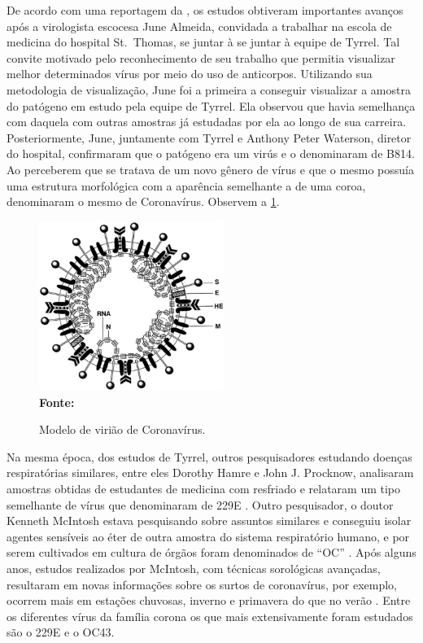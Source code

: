 \documentclass[
  fleqn,ebook]{ic}
\begin{document}
De acordo com uma reportagem da \cite{almeidaBBC}, os estudos obtiveram
importantes avanços após a virologista escocesa June Almeida, convidada
a trabalhar na escola de medicina do hospital St.~Thomas, se juntar à se juntar
à equipe de Tyrrel. Tal convite motivado pelo reconhecimento de seu trabalho que
permitia visualizar melhor determinados vírus por meio do uso de anticorpos.
Utilizando sua metodologia de visualização, June foi a primeira a conseguir
visualizar a amostra do patógeno em estudo pela equipe de Tyrrel. Ela observou
que havia semelhança com daquela com outras amostras já estudadas por ela ao
longo de sua carreira. Posteriormente, June, juntamente com Tyrrel e Anthony
Peter Waterson, diretor do hospital, confirmaram que o patógeno era um virús e
o denominaram de B814. Ao perceberem que se tratava de um novo gênero de vírus e
que o mesmo possuía uma estrutura morfológica com a aparência semelhante a de
uma coroa, denominaram o mesmo de Coronavírus. Observem a \ref{fig:coroa}.

\begin{figure}[H]
    \centering
    \caption{Modelo de virião de Coronavírus.}
    \includegraphics[width=6cm]{img/coroa.jpg}\\
    {\footnotesize \textbf{Fonte: }\cite{holmes1999coronaviruses}}
    \label{fig:coroa}
\end{figure}

Na mesma época, dos estudos de Tyrrel, outros pesquisadores estudando doenças
respiratórias similares, entre eles Dorothy Hamre e John J. Procknow, analisaram
amostras obtidas de estudantes de medicina com resfriado e relataram um tipo
semelhante de vírus que denominaram de 229E \citep{hamre1966new}. Outro pesquisador,
o doutor Kenneth McIntosh estava pesquisando sobre assuntos similares e
conseguiu isolar agentes sensíveis ao éter de outra amostra do sistema
respiratório humano, e por serem cultivados em cultura de órgãos foram
denominados de ``OC'' \citep{mcintosh1967recovery}. Após alguns anos, estudos
realizados por McIntosh, com técnicas sorológicas avançadas, resultaram em novas
informações sobre os surtos de coronavírus, por exemplo, ocorrem mais em
estações chuvosas, inverno e primavera do que no verão
\citep{mcintosh1970seroepidemiologic}. Entre os diferentes vírus da família corona os
que mais extensivamente foram estudados são o 229E e o OC43.
\end{document}
